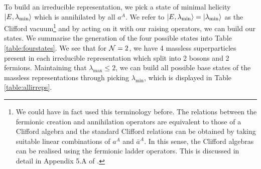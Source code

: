 To build an irreducible representation, we pick a state of minimal helicity $\ket{E, \lambda_{\text{min}}}$ which is annihilated by all $a^A$. We refer to $\ket{E, \lambda_{\text{min}}} = \ket{\lambda_{\text{min}}}$ as the Clifford vacuum\footnote{We could have in fact used this terminology before. The relations between the fermionic creation and annihilation operators are equivalent to those of a Clifford algebra and the standard Clifford relations can be obtained by taking suitable linear combinations of $a^A$ and $\bar{a}^A$. In this sense, the Clifford algebras can be realised using the fermionic ladder operators. This is discussed in detail in Appendix 5.A of \cite{Green:1987sp}.} \cite{Wess:1992cp} and by acting on it with our raising operators, we can build our states. We summarise the generation of the four possible states into Table \ref{table:fourstates}. We see that for ${\cal N} = 2$, we have 4 massless superparticles present in each irreducible representation which split into 2 bosons and 2 fermions. Maintaining that $\lambda_{\text{max}} \leq 2$, we can build all possible base states of the massless representations through picking $\lambda_{\text{min}}$, which is displayed in Table \ref{table:allirreps}. 

